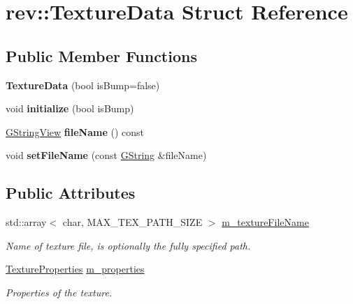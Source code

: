\hypertarget{structrev_1_1_texture_data}{}\section{rev\+::Texture\+Data Struct Reference}
\label{structrev_1_1_texture_data}
\subsection*{Public Member Functions}
\begin{DoxyCompactItemize}
\item 
\mbox{\label{structrev_1_1_texture_data_abdf423a86447b4a0f82770eeb13b4baf}} 
{\bfseries Texture\+Data} (bool is\+Bump=false)
\item 
\mbox{\label{structrev_1_1_texture_data_a777ca3970ceaebd8fbb826efd2527e7a}} 
void {\bfseries initialize} (bool is\+Bump)
\item 
\mbox{\label{structrev_1_1_texture_data_a732e7765f79fd2ac49291443f15f9289}} 
\mbox{\hyperlink{classrev_1_1_g_string_view}{G\+String\+View}} {\bfseries file\+Name} () const
\item 
\mbox{\label{structrev_1_1_texture_data_ab2ede1409208ee6f94720d1cbbc35855}} 
void {\bfseries set\+File\+Name} (const \mbox{\hyperlink{classrev_1_1_g_string}{G\+String}} \&file\+Name)
\end{DoxyCompactItemize}
\subsection*{Public Attributes}
\begin{DoxyCompactItemize}
\item 
std\+::array$<$ char, M\+A\+X\+\_\+\+T\+E\+X\+\_\+\+P\+A\+T\+H\+\_\+\+S\+I\+ZE $>$ \mbox{\hyperlink{structrev_1_1_texture_data_a389c7fd86b45d4b3d18a58d4f0f5a1a7}{m\+\_\+texture\+File\+Name}}
\begin{DoxyCompactList}\small\item\em Name of texture file, is optionally the fully specified path. \end{DoxyCompactList}\item 
\mbox{\label{structrev_1_1_texture_data_a44ce48b1ff9570f0bf66b284526363d1}} 
\mbox{\hyperlink{structrev_1_1_texture_properties}{Texture\+Properties}} \mbox{\hyperlink{structrev_1_1_texture_data_a44ce48b1ff9570f0bf66b284526363d1}{m\+\_\+properties}}
\begin{DoxyCompactList}\small\item\em Properties of the texture. \end{DoxyCompactList}\end{DoxyCompactItemize}


